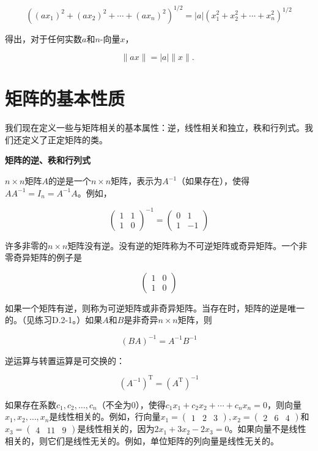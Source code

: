 \documentclass[lang=cn,newtx,10pt,scheme=chinese]{elegantbook}
\begin{document}
$$
\left(\left(a x_1\right)^2+\left(a x_2\right)^2+\cdots+\left(a x_n\right)^2\right)^{1 / 2}=|a|\left(x_1^2+x_2^2+\cdots+x_n^2\right)^{1 / 2}
$$

得出，对于任何实数$a$和$n$-向量$x$，

$$
\|a x\|=|a|\|x\| \text {. }
$$

\section{矩阵的基本性质}

我们现在定义一些与矩阵相关的基本属性：逆，线性相关和独立，秩和行列式。我们还定义了正定矩阵的类。

\textbf{矩阵的逆、秩和行列式}

$n \times n$矩阵$A$的逆是一个$n \times n$矩阵，表示为$A^{-1}$（如果存在），使得$A A^{-1}=I_n=A^{-1} A$。例如，

$$
\left(\begin{array}{ll}
1 & 1 \\
1 & 0
\end{array}\right)^{-1}=\left(\begin{array}{rr}
0 & 1 \\
1 & -1
\end{array}\right)
$$

许多非零的$n \times n$矩阵没有逆。没有逆的矩阵称为不可逆矩阵或奇异矩阵。一个非零奇异矩阵的例子是

$$
\left(\begin{array}{ll}
1 & 0 \\
1 & 0
\end{array}\right)
$$

如果一个矩阵有逆，则称为可逆矩阵或非奇异矩阵。当存在时，矩阵的逆是唯一的。（见练习D.2-1。）如果$A$和$B$是非奇异$n \times n$矩阵，则

$$
(B A)^{-1}=A^{-1} B^{-1}
$$

逆运算与转置运算是可交换的：

$$
\left(A^{-1}\right)^{\mathrm{T}}=\left(A^{\mathrm{T}}\right)^{-1}
$$

如果存在系数$c_1, c_2, \ldots, c_n$（不全为0），使得$c_1 x_1+c_2 x_2+\cdots+c_n x_n=0$，则向量$x_1, x_2, \ldots, x_n$是线性相关的。例如，行向量$x_1=\left(\begin{array}{lll}1 & 2 & 3\end{array}\right), x_2=\left(\begin{array}{lll}2 & 6 & 4\end{array}\right)$和$x_3=\left(\begin{array}{lll}4 & 11 & 9\end{array}\right)$是线性相关的，因为$2 x_1+3 x_2-2 x_3=0$。如果向量不是线性相关的，则它们是线性无关的。例如，单位矩阵的列向量是线性无关的。
\end{document}
